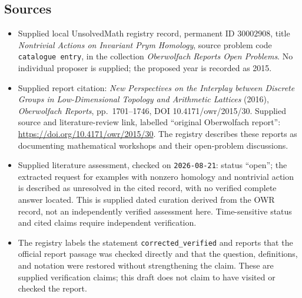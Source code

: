 \documentclass[11pt]{article}
\begin{document}
\subsection{Sources}
\begin{itemize}
\item Supplied local UnsolvedMath registry record, permanent ID \(30002908\), title \emph{Nontrivial Actions on Invariant Prym Homology}, source problem code \texttt{catalogue entry}, in the collection \emph{Oberwolfach Reports Open Problems}. No individual proposer is supplied; the proposed year is recorded as 2015.
\item Supplied report citation: \emph{New Perspectives on the Interplay between Discrete Groups in Low-Dimensional Topology and Arithmetic Lattices} (2016), \emph{Oberwolfach Reports}, pp.\ 1701--1746, DOI 10.4171/owr/2015/30. Supplied source and literature-review link, labelled ``original Oberwolfach report'': \url{https://doi.org/10.4171/owr/2015/30}. The registry describes these reports as documenting mathematical workshops and their open-problem discussions.
\item Supplied literature assessment, checked on \texttt{2026-08-21}: status ``open''; the extracted request for examples with nonzero homology and nontrivial action is described as unresolved in the cited record, with no verified complete answer located. This is supplied dated curation derived from the OWR record, not an independently verified assessment here. Time-sensitive status and cited claims require independent verification.
\item The registry labels the statement \texttt{corrected\_verified} and reports that the official report passage was checked directly and that the question, definitions, and notation were restored without strengthening the claim. These are supplied verification claims; this draft does not claim to have visited or checked the report.
\end{itemize}
\end{document}
